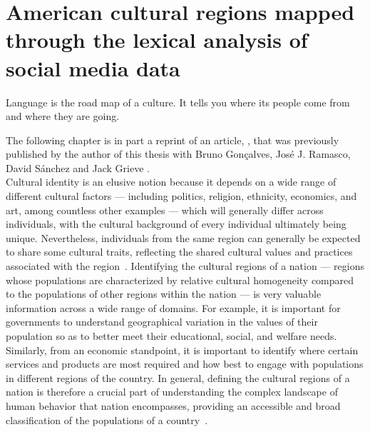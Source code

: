 \documentclass[../thesis.tex]{subfiles}
\begin{document}
\chapter{American cultural regions mapped through the lexical analysis of social media data}
\label{ch:acr}

\epigraph{
  Language is the road map of a culture. It tells you where its people come from and
  where they are going.
}{
}

The following chapter is in part a reprint of an article,
, that was previously published by the author of
this thesis with Bruno Gon\c{c}alves, Jos\'{e} J. Ramasco, David S\'{a}nchez and Jack
Grieve \cite{LoufAmericanCultural2022}. \\

Cultural identity is an elusive notion because it depends on a wide range of different
cultural factors --- including politics, religion, ethnicity, economics, and art, among
countless other examples --- which will generally differ across individuals, with the
cultural background of every individual ultimately being unique. Nevertheless,
individuals from the same region can generally be expected to share some cultural
traits, reflecting the shared cultural values and practices associated with the
region~\cite{broek1973geography}. Identifying the cultural regions of a nation ---
regions whose populations are characterized by relative cultural homogeneity compared to
the populations of other regions within the nation --- is very valuable information
across a wide range of domains. For example, it is important for governments to
understand geographical variation in the values of their population so as to better meet
their educational, social, and welfare needs. Similarly, from an economic standpoint, it
is important to identify where certain services and products are most required and how
best to engage with populations in different regions of the country. In general,
defining the cultural regions of a nation is therefore a crucial part of understanding
the complex landscape of human behavior that nation encompasses, providing an accessible
and broad classification of the populations of a country~\cite{lane2016culture}.
\end{document}
